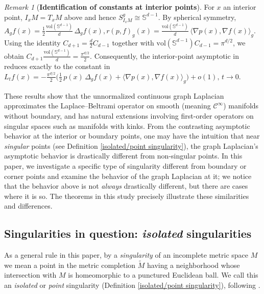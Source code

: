 \documentclass{amsart}
\let\oldcitet\citet
\renewcommand{\citet}[1]{\textcolor{blue}{\oldcitet{#1}}}
\theoremstyle{definition}
\theoremstyle{remark}
\newtheorem{remark}[theorem]{Remark}
\newcommand{\nd}{\noindent}
\newcommand{\0}{\boldsymbol{0}}
\def\cC{\mathcal C}
\begin{document}
\begin{remark}[\textbf{Identification of constants at interior points}]
For $x$ an interior point, $I_xM = T_xM$ above and hence $S^g_{I_xM} \cong \mathbb{S}^{d-1}$. By spherical symmetry,
\(
A_g f(x)
= \frac12 \frac{\mathrm{vol}(\mathbb{S}^{d-1})}{d}\,\Delta_g f(x),
r(p,f)_g(x)
= \frac{\mathrm{vol}(\mathbb{S}^{d-1})}{d}\,
\langle \nabla p(x), \nabla f(x) \rangle_g .
\)
Using the identity $C_{d+1} = \frac{d}{2} C_{d-1}$ together with
$\mathrm{vol}(\mathbb{S}^{d-1}) C_{d-1} = \pi^{d/2}$, we obtain
\(
C_{d+1}\frac{\mathrm{vol}(\mathbb{S}^{d-1})}{d}
= \frac{\pi^{d/2}}{2}.
\)
Consequently, the interior-point asymptotic in
\citet{PalTewodrose2025} reduces exactly to the
 constant in \citet{BelkinNiyogi2008}
\(
L_t f(x)
=
-\frac{\pi^{d/2}}{2}
\Big(
\tfrac12\,p(x)\,\Delta_g f(x)
+
\langle \nabla p(x), \nabla f(x) \rangle_g
\Big)
+ o(1),
\, t \to 0 .
\)
\end{remark}


\nd These results show that the unnormalized continuous graph Laplacian approximates the Laplace--Beltrami operator on smooth (meaning $\cC^{\infty}$) manifolds without boundary, and has natural extensions involving first-order operators on singular spaces such as manifolds with kinks. From the contrasting asymptotic behavior at the interior or boundary points, one may have the intuition that near \textit{singular} points (see Definition \ref{isolated/point singularity}), the graph Laplacian's asymptotic behavior is drastically different from non-singular points. In this paper, we investigate a specific type of singularity different from boundary or corner points and examine the behavior of the graph Laplacian at it; we notice that the behavior above is not\textit{ always} drastically different, but there are cases where it is so. The theorems in this study precisely illustrate these similarities and differences.


\subsection{Singularities in question: \textit{isolated} singularities}


As a general rule in this paper, by a \textit{singularity} of an incomplete metric space $M$ we mean a point in the metric completion $\widetilde{M}$ having a neighborhood whose intersection with $M$ is homeomorphic to a punctured Euclidean ball. We call this an \textit{isolated} or \textit{point} singularity (Definition \ref{isolated/point singularity}), following \citet{SmithYang1992}.
\end{document}
